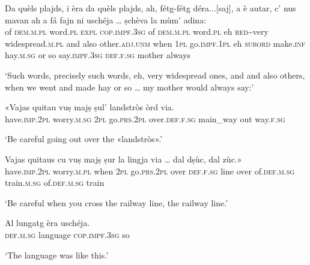 \begin{linenumbers}
\gll    Da quèls plajds\footnotemark, i èra da quèls plajds, ah, fétg-fétg déra...[saj], a è autar, c' nus mavan ah a fá fajn ni uschéja … ṣchèva la mùm’ adina:\\
of \textsc{dem.m.pl} word.\textsc{pl} \textsc{expl} \textsc{cop.impf.3sg} of \textsc{dem.m.pl} word.\textsc{pl} eh \textsc{red}\textasciitilde{very} widespread.\textsc{m.pl} and also other.\textsc{adj.unm} when \textsc{1pl} go.\textsc{impf.1pl} eh \textsc{subord} make.\textsc{inf} hay.\textsc{m.sg} or so {} say.\textsc{impf.3sg} \textsc{def.f.sg} mother always\\
\end{linenumbers}
\medskip
\glt `Such words, precisely such words, eh, very widespread ones, and and also others, when we went and made hay or so … my mother would always say:'
\medskip

\begin{linenumbers}
\gll   «Vajas quitau vuṣ majṣ ṣul' landstròs òrd via. \\
have.\textsc{imp.2pl} worry.\textsc{m.sg} \textsc{2pl} go.\textsc{prs.2pl}  over.\textsc{def.f.sg} main\_way out way.\textsc{f.sg} \\
\end{linenumbers}
\medskip
\glt `Be careful going out over the «landstròs».'
\medskip

\begin{linenumbers}
\gll    Vajas quitaus cu vuṣ majṣ ṣur la lingja via …\footnotemark{} dal dṣùc, dal zùc\footnotemark.»\\
have.\textsc{imp.2pl} worry.\textsc{m.pl} when \textsc{2pl} go.\textsc{prs.2pl} over \textsc{def.f.sg} line over {} of.\textsc{def.m.sg} train.\textsc{m.sg} of.\textsc{def.m.sg} train\\
\end{linenumbers}
\medskip
\glt `Be careful when you cross the railway line, the railway line.' 
\medskip

\begin{linenumbers}
\gll    Al lungatg èra uschéja.\\
 \textsc{def.m.sg} language \textsc{cop.impf.3sg} so\\
\end{linenumbers}
\medskip
\glt `The language was like this.'
\medskip

